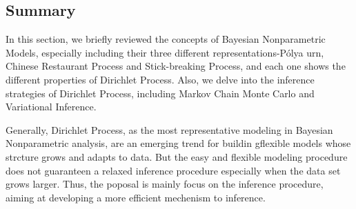 	\subsection{Summary}
	
	In this section, we briefly reviewed the concepts of Bayesian Nonparametric Models, especially  including their three different representations-P\'{o}lya urn, Chinese Restaurant Process and Stick-breaking Process, and each one shows the different properties of Dirichlet Process. Also, we delve into the inference strategies of Dirichlet Process, including Markov Chain Monte Carlo and Variational Inference. 
   
    Generally, Dirichlet Process, as the most representative modeling in Bayesian Nonparametric analysis, are an emerging trend for buildin gflexible models whose strcture grows and adapts to data. But the easy and flexible modeling procedure does not guaranteen a relaxed inference procedure especially when the data set grows larger. Thus, the poposal is mainly focus on the inference procedure, aiming at developing a more efficient mechenism to inference.  